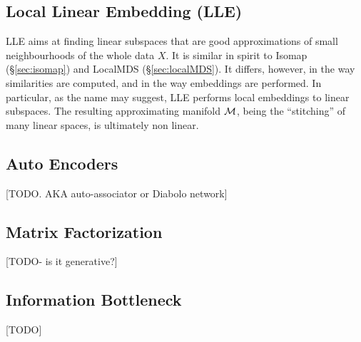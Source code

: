 \documentclass[12pt,a4paper]{article}
\begin{document}
\subsection{Local Linear Embedding (LLE)}
\label{sec:lle}



LLE aims at finding linear subspaces that are good approximations of small neighbourhoods of the whole data $X$.
It is similar in spirit to Isomap (\S\ref{sec:isomap}) and LocalMDS (\S\ref{sec:localMDS}).
It differs, however, in the way similarities are computed, and in the way embeddings are performed. 
In particular, as the name may suggest, LLE performs local embeddings to linear subspaces. The resulting approximating manifold $\mathcal{M}$, being the ``stitching'' of many linear spaces, is ultimately non linear.




\subsection{Auto Encoders}
\label{sec:auto_encoders}
[TODO. AKA auto-associator or Diabolo network]



\subsection{Matrix Factorization}
\label{sec:matrix_factorization}
[TODO- is it generative?]



\subsection{Information Bottleneck}
[TODO]

%
%
%
\end{document}
